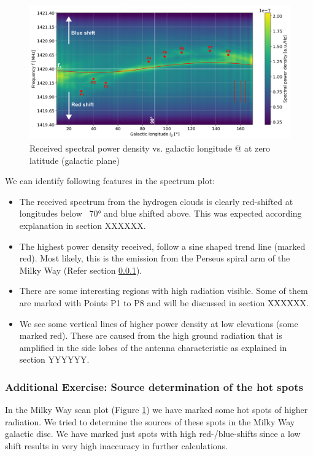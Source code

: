 \begin{figure}[H]
    \centering
    \includegraphics[width=\textwidth]{assets/spectrum_plot_edit.png}
    \caption{Received spectral power density vs. galactic longitude @ at zero latitude (galactic plane)}
    \label{fig:mw_spectrum_plot}
\end{figure}

We can identify following features in the spectrum plot:

\begin{itemize}
    \item The received spectrum from the hydrogen clouds is clearly red-shifted at longitudes below ~70° and blue shifted above. This was expected according explanation in section XXXXXX.
    \item The highest power density received, follow a sine shaped trend line (marked red). Most likely, this is the emission from the Perseus spiral arm of the Milky Way (Refer section \ref{sec:HotSpots}).
    \item There are some interesting regions with high radiation visible. Some of them are marked with Points P1 to P8 and will be discussed in section XXXXXX.
    \item We see some vertical lines of higher power density at low elevations (some marked red). These are caused from the high ground radiation that is amplified in the side lobes of the antenna characteristic as explained in section YYYYYY.
\end{itemize}



\subsubsection{Additional Exercise: Source determination of the hot spots}\label{sec:HotSpots}
In the Milky Way scan plot (Figure \ref{fig:mw_spectrum_plot}) we have marked some hot spots of higher radiation. We tried to determine the sources of these spots in the Milky Way galactic disc. We have marked just spots with high red-/blue-shifts since a low shift results in very high inaccuracy in further calculations.

